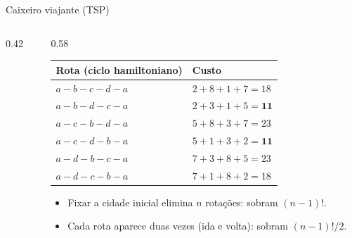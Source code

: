 \documentclass[aspectratio=169]{beamer}
\begin{document}
\begin{frame}{Caixeiro viajante (TSP)}
  \begin{columns}[T]
    \begin{column}{0.42\textwidth}
      \begin{center}
      \end{center}
    \end{column}
    \begin{column}{0.58\textwidth}
      \scriptsize
      \begin{tabular}{@{}ll@{}}
        \toprule
        Rota (ciclo hamiltoniano) & Custo \\
        \midrule
        $a\!-\!b\!-\!c\!-\!d\!-\!a$ & $2+8+1+7 = 18$ \\
        $a\!-\!b\!-\!d\!-\!c\!-\!a$ & $2+3+1+5 = \mathbf{11}$ \\
        $a\!-\!c\!-\!b\!-\!d\!-\!a$ & $5+8+3+7 = 23$ \\
        $a\!-\!c\!-\!d\!-\!b\!-\!a$ & $5+1+3+2 = \mathbf{11}$ \\
        $a\!-\!d\!-\!b\!-\!c\!-\!a$ & $7+3+8+5 = 23$ \\
        $a\!-\!d\!-\!c\!-\!b\!-\!a$ & $7+1+8+2 = 18$ \\
        \bottomrule
      \end{tabular}
      \smallskip
      \begin{itemize}
        \item Fixar a cidade inicial elimina $n$ rotações: sobram $(n-1)!$.
        \item Cada rota aparece duas vezes (ida e volta): sobram $(n-1)!/2$.
      \end{itemize}
    \end{column}
  \end{columns}
\end{frame}
\end{document}
